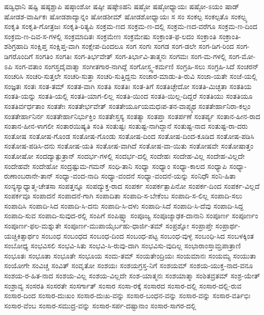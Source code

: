 {ಷಡ್ವಿಧಾನಿ
ಷಷ್ಟಿ
ಷಷ್ಠಶ್ಚಾಪಿ
ಷಷ್ಠಾಂಶೋ
ಷಷ್ಠೀ
ಷಷ್ಠೇಽಹನಿ
ಷಷ್ಠೋ
ಷಷ್ಠೋಧ್ಯಾಯಃ
ಷಷ್ಠೋ-ಽಯಂ
ಷಾಡ್
ಷೋಡಶ-ವಾರ್ಷಿಕಃ
ಷೋಡಶಾದ್ಯಾನ್ನಂ
ಷೋಡಶೀಮ್
ಷೋಡಶೋಧ್ಯಾಯಃ
ಸ
ಸಂ
ಸಂಕಲ್ಪ
ಸಂಕಲ್ಪತೊ
ಸಂಕಲ್ಪ್ಯ
ಸಂಕೃತಿ
ಸಂಕೃತಿ-ಗೋತ್ರಜಃ
ಸಂಕೃತಿ-ರಿತ್ಯಪಿ
ಸಂಕ್ರಮ-ಣದ
ಸಂಕ್ರಮ-ಣ-ದಲ್ಲಿ
ಸಂಕ್ರಮ-ಣದ-ವರೆಗೂ
ಸಂಕ್ರಮ-ಣ-ದಿಂದ
ಸಂಕ್ರಮ-ಣ-ದಿವ-ಸ-ಗಳಲ್ಲಿ
ಸಂಕ್ರಮಾದಿತಃ
ಸಂಕ್ರಮೇಣ
ಸಂಕ್ರಮೇಷು
ಸಂಕ್ರಾಂತ-ಫ-ಲದಂ
ಸಂಕ್ರಾಂತಿ
ಸಂಕ್ರಾಂತಿ-ಶಶಿಗ್ರಹಾದಿ
ಸಂಕ್ಷಿಪ್ತ
ಸಂಕ್ಷಿಪ್ತ-ವಾಗಿ
ಸಂಕ್ಷೇಪ-ದಿಂದಲೂ
ಸಂಗ
ಸಂಗಃ
ಸಂಗಡ
ಸಂಗ-ಡಲೇ
ಸಂಗ-ಡಿಗ-ರಿಂದ
ಸಂಗ-ಡಿಗರೊಂದಿಗೆ
ಸಂಗತಿಂ
ಸಂಗತಿಃ
ಸಂಗ-ತಿರ್ಭವೇತ್
ಸಂಗ-ತಿರ್ಭಾವಿ-ತಾತ್ಮನಃ
ಸಂಗಮಃ
ಸಂಗ-ಮ-ಗಳಲ್ಲಿ
ಸಂಗ-ಮೋ-ಽಪಿ
ಸಂಗ-ವತಾಂ
ಸಂಗಸ್ತದೈವಾತ್ಮಾ
ಸಂಗೀತಗಾರ-ನಾಗಿದ್ದೆ
ಸಂಗೋಸ್ತ್ವ-ಕರ್ಮಣಿ
ಸಂಗ್ರಹಿ-ಸಲು
ಸಂಗ್ರಹಿ-ಸಿದೆ
ಸಂಚರನ್
ಸಂಚರಿಸಿ
ಸಂಚರಿ-ಸುತ್ತಲೇ
ಸಂಚರಿ-ಸುತ್ತಾ
ಸಂಚರಿ-ಸುತ್ತಿದ್ದನು
ಸಂಚಾರ-ಮಾಡು-ತಿ-ರುವಿ
ಸಂಜಾ-ಯತೇ
ಸಂಜೆ-ಯಲ್ಲಿ
ಸಂಜ್ಞತಃ
ಸಂತಃ
ಸಂತ-ತಮ್
ಸಂತತ-ವಾಗಿ
ಸಂತತಿ
ಸಂತತಿಃ
ಸಂತ-ತಿಗೆ
ಸಂತತಿಚ್ಛೇದೋ
ಸಂತತಿ-ಮಿಚ್ಛತಾ
ಸಂತತಿಯ
ಸಂತತಿ-ಯನ್ನು
ಸಂತತಿ-ಯಲ್ಲಿ
ಸಂತತಿ-ಯಾಗ-ಲಿಲ್ಲ
ಸಂತತಿ-ಯಿಂದ
ಸಂತತಿ-ಯಿಲ್ಲ-ದಿದ್ದರೆ
ಸಂತತಿಯು
ಸಂತತಿಯೂ
ಸಂತತಿರ್ವರ್ಧತಾಂ
ಸಂತತೇಃ
ಸಂತತೇರ್ಭವೇತ್
ಸಂತತೇರ್ಯೂಯಮಧಃಪ-ತನ-ವಾಪ್ಸ್ಯಥ
ಸಂತತೇರ್ಹಾನಿರಾ-ಕಲ್ಪಂ
ಸಂತತೇರ್ಹಾನಿರ್ನ
ಸಂತತೇರ್ಹಾನಿರ್ಭುಕ್ತಿಂ
ಸಂತತೇಸ್ತಸ್ಯ
ಸಂತತ್ಯಾ
ಸಂತಪ್ತಾ
ಸಂತರ್ಪಣೆ
ಸಂತರ್ಪ್ಯ
ಸಂತಾನ-ಹೀನ-ರಾದ
ಸಂತಾನ-ಹೀನ-ಳಾಗಲೀ
ಸಂತಾರಯಿಷ್ಯತಿ
ಸಂತಿ
ಸಂತುಷ್ಟಃ
ಸಂತುಷ್ಟ-ನಾಗಿದ್ದಾನೆ
ಸಂತುಷ್ಟ-ನಾದ
ಸಂತುಷ್ಟ-ರಾ-ದರು
ಸಂತೋಷ
ಸಂತೋಷ-ಗೊಂಡ
ಸಂತೋಷ-ಗೊಂಡು
ಸಂತೋಷ-ದಿಂದ
ಸಂತೋಷ-ದಿಂದ-ಕೂಡಿದ
ಸಂತೋಷ-ಪಡಿಸಿ
ಸಂತೋಷ-ಪಡಿಸಿ-ದನು
ಸಂತೋಷ-ಯತಿ
ಸಂತೋಷ-ವಾಗಿದೆ
ಸಂತೋಷ-ವಾ-ಯಿತು
ಸಂತೋಷವೇ
ಸಂತೋಷಾತ್ತಂ
ಸಂತೋಷೋ
ಸಂದದ್ಯಾತ್ಪುತ್ರಾನ್
ಸಂದರ್ಭ-ಗಳಲ್ಲಿ
ಸಂದರ್ಭ-ದಲ್ಲಿ
ಸಂದೇಹಃ
ಸಂದೇಹ-ವಿಲ್ಲ
ಸಂದೇಹ-ವಿಲ್ಲದೇ
ಸಂದೇಹವೇ
ಸಂದೇಹೋ
ಸಂದ್ರಷ್ಟುಮ-ಗಮನ್
ಸಂಧಿ-ತಾನಿ
ಸಂಧ್ಯಾ
ಸಂಧ್ಯಾಂ
ಸಂಧ್ಯಾ-ಕಾಲದ
ಸಂಧ್ಯಾಪಿ
ಸಂಧ್ಯಾ-ರುಣಾಂಬರಾನೇ-ತಾನ್
ಸಂಧ್ಯಾ-ವಂದ-ನಾದಿ
ಸಂಧ್ಯಾ-ವಂದನೆ
ಸಂಧ್ಯಾ-ವಂದನೆ-ಯನ್ನು
ಸಂನಿಧೌ
ಸಂನಿ-ಹಿತಾ
ಸಂನ್ಯಸ್ಯಾಧ್ಯಾತ್ಮ-ಚೇತಸಾ
ಸಂಪತ್ತನ್ನೂ
ಸಂಪದ್ಯುಕ್ತ-ರಾದ
ಸಂಪರ್ಕ
ಸಂಪರ್ಕತ್ಪಾಪಿನೋ
ಸಂಪರ್ಕ-ದಿಂದ
ಸಂಪರ್ಕ-ವಿಲ್ಲದೆ
ಸಂಪರ್ಕವೂ
ಸಂಪಾದನೆ
ಸಂಪಾದನೆ-ಗಾಗಿ
ಸಂಪಾದಿತಾ
ಸಂಪಾದಿ-ಸ-ಬೇಕೆಂಬ
ಸಂಪಾದಿ-ಸ-ಲಿಲ್ಲ
ಸಂಪಾದಿ-ಸಲು
ಸಂಪಾದಿಸಿ
ಸಂಪಾದಿ-ಸಿದ
ಸಂಪಾದಿ-ಸಿ-ದನು
ಸಂಪಾದಿ-ಸಿ-ದಳು
ಸಂಪಾದಿ-ಸಿದೆ
ಸಂಪಾದಿ-ಸಿ-ದೆವು
ಸಂಪಾದಿ-ಸಿದ್ದ
ಸಂಪಾದಿ-ಸುವ
ಸಂಪಾದಿ-ಸುವುದ-ರಲ್ಲಿ
ಸಂಪಿಗೆ
ಸಂಪಿಷ್ಟ್ವಾ
ಸಂಪೂಜ್ಯ
ಸಂಪೂಜ್ಯಾಢಕ-ದಾನಾನಿ
ಸಂಪೂರ್ಣ
ಸಂಪೂರ್ಣಂ
ಸಂಪೂರ್ಣ-ಫಲ-ಮಶ್ನುತೇ
ಸಂಪೂರ್ಣ-ಮುಪಾಯೈರ್ಬಹು-ಧಾರ್ಜಿ-ತಮ್
ಸಂಪ್ರಶ್ನೋ
ಸಂಪ್ರಾಪ್ತೇ
ಸಂಪ್ರಾರ್ಥ-ಯಚ್ಚಿಕಿತ್ಸಾರ್ಥಂ
ಸಂಬಂಧ
ಸಂಬಂಧದ
ಸಂಬಂಧ-ದಿಂದ
ಸಂಬಂಧ-ಪಟ್ಟ
ಸಂಬಂಧ-ವುಳ್ಳ
ಸಂಬಂಧಿ-ಸಿದ
ಸಂಬಳಕ್ಕಿಂತ
ಸಂಬೋಧ್ಯ
ಸಂಭವಿಸಲಿ
ಸಂಭವಿ-ಸಿತು
ಸಂಭವಿ-ಸಿ-ರುವು-ದಾಗಿ
ಸಂಭವಿಸು-ವುದಿಲ್ಲ
ಸಂಭಾರಾಂಸ್ತಾಮ್ರಪಾತ್ರಾಣಿ
ಸಂಭೂತಃ
ಸಂಭೂತಾ
ಸಂಭೂತೇ
ಸಂಭೂಯ
ಸಂಮ-ತಮ್
ಸಂಯತೇಂದ್ರಿಯಃ
ಸಂಯಮಾನಃ
ಸಂಯಮ್ಯ
ಸಂಯುತಾ
ಸಂಯೋಗೇ
ಸಂವಿಚ್ಚ
ಸಂವಿತ್
ಸಂವೃತೋ
ಸಂಶಯಃ
ಸಂಶಯಗ್ರಸ್ತ-ನಿಗೆ
ಸಂಶಯಮ್
ಸಂಶಯ-ಯುಕ್ತ-ನಾದ-ವನೂ
ಸಂಶಯ-ರ-ಹಿತ-ನಾದ
ಸಂಶಯ-ವಿಲ್ಲ
ಸಂಶಯ-ವಿಲ್ಲದೇ
ಸಂಶ-ಯಾತ್ಮನಃ
ಸಂಶಯಾತ್ಮಾ
ಸಂಶಿತವ್ರತಮ್
ಸಂಶ್ರ-ಯೇತ್
ಸಂಶ್ರಾವ್ಯ
ಸಂಸರತಿ
ಸಂಸರತೇ
ಸಂಸರ್ಗಾತ್
ಸಂಸಾರ
ಸಂಸಾ-ರಕ್ಕೆ
ಸಂಸಾರದ
ಸಂಸಾರ-ದಲ್ಲಿ
ಸಂಸಾರ-ದಲ್ಲಿ-ರುವ
ಸಂಸಾರ-ದಿಂದ
ಸಂಸಾರ-ದುಃಖಂ
ಸಂಸಾರ-ದುಃಖ-ವನ್ನು
ಸಂಸಾರ-ಬಂಧನ-ವನ್ನು
ಸಂಸಾರ-ವನ್ನು
ಸಂಸಾರ-ವರ್ತಿಭಿಃ
ಸಂಸಾರ-ವೆಂಬ
ಸಂಸಾರ-ಸಮುದ್ರ-ವನ್ನು
ಸಂಸಾರ-ಸರ್ಪ-ದಷ್ಟಾನಾಂ
ಸಂಸಾರ-ಸಾಗರ-ದಲ್ಲಿ
}
